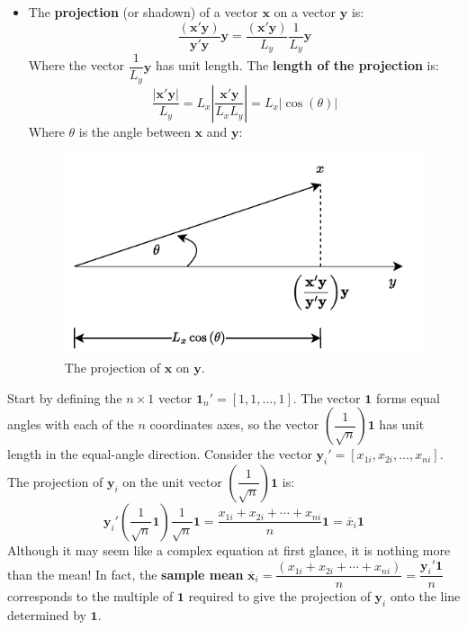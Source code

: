 \documentclass[a4paper]{article}
\newcommand{\definition}[1]{\textcolor{Red3}{\textbf{#1}}\index{#1}}
\begin{document}
\begin{itemize}
        \item The \definition{projection} (or shadown) of a vector $\mathbf{x}$ on a vector $\mathbf{y}$ is:
        \begin{equation}\label{eq: projection}
            \dfrac{\left(\mathbf{x}'\mathbf{y}\right)}{\mathbf{y}'\mathbf{y}}\mathbf{y} = \dfrac{\left(\mathbf{x}'\mathbf{y}\right)}{L_{y}}\dfrac{1}{L_{y}}\mathbf{y}
        \end{equation}
        Where the vector $\dfrac{1}{L_{y}}\mathbf{y}$ has unit length. The \textbf{length of the projection} is:
        \begin{equation}\label{eq: length of the projection}
            \dfrac{\left| \mathbf{x}'\mathbf{y} \right|}{L_{y}} = L_{x} \left| \dfrac{\mathbf{x}'\mathbf{y}}{L_{x}L_{y}} \right| = L_{x} \left| \cos\left(\theta\right) \right|
        \end{equation}
        Where $\theta$ is the angle between $\mathbf{x}$ and $\mathbf{y}$:
        \begin{figure}[!htp]
            \centering
            \includegraphics[width=.7\textwidth]{img/basics-vector-algebra-2.pdf}
            \caption{The projection of $\mathbf{x}$ on $\mathbf{y}$.}
        \end{figure}
    \end{itemize}
    Start by defining the $n \times 1$ vector $\mathbf{1}_{n}' = \left[1, 1, \dots, 1\right]$. The vector $\mathbf{1}$ forms equal angles with each of the $n$ coordinates axes, so the vector $\left(\dfrac{1}{\sqrt{n}}\right)\mathbf{1}$ has unit length in the equal-angle direction. Consider the vector $\mathbf{y}_{i}' = \left[x_{1i}, x_{2i}, \dots, x_{ni}\right]$. The projection of $\mathbf{y}_{i}$ on the unit vector $\left(\dfrac{1}{\sqrt{n}}\right)\mathbf{1}$ is:
    \begin{equation}\label{eq: sample mean - geometrical representation}
        \mathbf{y}_{i}'\left(\dfrac{1}{\sqrt{n}}\mathbf{1}\right)\dfrac{1}{\sqrt{n}}\mathbf{1} = 
        \dfrac{x_{1i} + x_{2i} + \cdots + x_{ni}}{n}\mathbf{1} = \overline{x}_{i}\mathbf{1}
    \end{equation}
    Although it may seem like a complex equation at first glance, it is nothing more than the mean! In fact, the \textbf{sample mean} $\overline{\mathbf{x}}_{i} = \dfrac{\left(x_{1i} + x_{2i} + \cdots + x_{ni}\right)}{n} = \dfrac{\mathbf{y}_{i}' \mathbf{1}}{n}$ corresponds to the multiple of $\mathbf{1}$ required to give the projection of $\mathbf{y}_{i}$ onto the line determined by $\mathbf{1}$.\newpage
\end{document}
